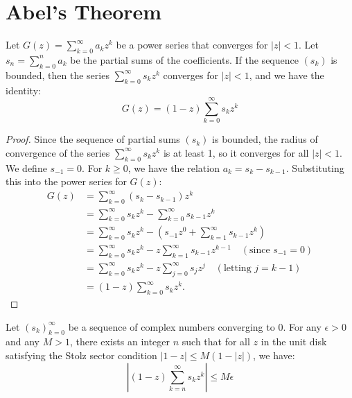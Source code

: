 \chapter{Abel's Theorem}

\begin{lemma}
Let $G(z) = \sum_{k=0}^{\infty} a_k z^k$ be a power series that converges for $|z| < 1$. Let $s_n = \sum_{k=0}^{n} a_k$ be the partial sums of the coefficients. If the sequence $(s_k)$ is bounded, then the series $\sum_{k=0}^{\infty} s_k z^k$ converges for $|z|<1$, and we have the identity:
$$G(z) = (1-z) \sum_{k=0}^{\infty} s_k z^k$$
\end{lemma}

\begin{proof}
Since the sequence of partial sums $(s_k)$ is bounded, the radius of convergence of the series $\sum_{k=0}^{\infty} s_k z^k$ is at least 1, so it converges for all $|z| < 1$. We define $s_{-1} = 0$. For $k \ge 0$, we have the relation $a_k = s_k - s_{k-1}$. Substituting this into the power series for $G(z)$:
\begin{align*}
G(z) & = \sum_{k=0}^{\infty} (s_k - s_{k-1}) z^k \\
& = \sum_{k=0}^{\infty} s_k z^k - \sum_{k=0}^{\infty} s_{k-1} z^k \\
& = \sum_{k=0}^{\infty} s_k z^k - \left(s_{-1}z^0 + \sum_{k=1}^{\infty} s_{k-1} z^k\right) \\
& = \sum_{k=0}^{\infty} s_k z^k - z \sum_{k=1}^{\infty} s_{k-1} z^{k-1} \quad (\text{since } s_{-1}=0) \\
& = \sum_{k=0}^{\infty} s_k z^k - z \sum_{j=0}^{\infty} s_j z^j \quad (\text{letting } j=k-1) \\
& = (1-z) \sum_{k=0}^{\infty} s_k z^k.
\end{align*}
\end{proof}

\begin{lemma}
Let $(s_k)_{k=0}^\infty$ be a sequence of complex numbers converging to $0$. For any $\epsilon > 0$ and any $M > 1$, there exists an integer $n$ such that for all $z$ in the unit disk satisfying the Stolz sector condition $|1-z| \le M(1-|z|)$, we have:
$$\left| (1-z) \sum_{k=n}^{\infty} s_k z^k \right| \le M\epsilon$$
\end{lemma}

